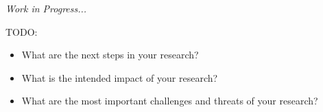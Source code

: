 \documentclass[ifip]{svmult}
\begin{document}
\textit{Work in Progress...}

TODO:

\begin{itemize}
  \item What are the next steps in your research?
  \item What is the intended impact of your research?
  \item What are the most important challenges and threats of your research?
\end{itemize}




\end{document}

